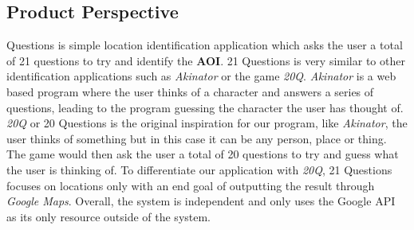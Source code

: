 \documentclass[titlepage]{article}
\begin{document}
		\subsection{Product Perspective}
		\label{sub:product_perspective}
		\indent {} Questions is simple location identification application which asks the user a total of 21 questions to try and identify the \textbf{AOI}. 21 Questions is very similar to other identification applications such as \textit{Akinator} or the game \textit{20Q}. \textit{Akinator} is a web based program where the user thinks of a character and answers a series of questions, leading to the program guessing the character the user has thought of. \textit{20Q} or 20 Questions is the original inspiration for our program, like \textit{Akinator}, the user thinks of something but in this case it can be any person, place or thing. The game would then ask the user a total of 20 questions to try and guess what the user is thinking of. To differentiate our application with \textit{20Q}, 21 Questions focuses on locations only with an end goal of outputting the result through \textit{Google Maps}. Overall, the system is independent and only uses the Google API as its only resource outside of the system.
		
\end{document}
